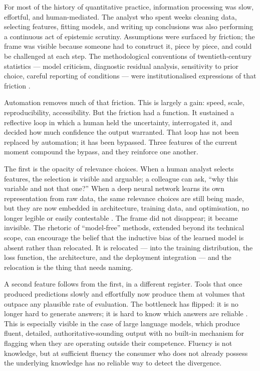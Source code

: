 \documentclass[11pt,a4paper]{article}
\begin{document}
For most of the history of quantitative practice, information processing
was slow, effortful, and human-mediated. The analyst who spent weeks
cleaning data, selecting features, fitting models, and writing up
conclusions was also performing a continuous act of epistemic scrutiny.
Assumptions were surfaced by friction; the frame was visible because
someone had to construct it, piece by piece, and could be challenged at
each step. The methodological conventions of twentieth-century statistics
--- model criticism, diagnostic residual analysis, sensitivity to prior
choice, careful reporting of conditions --- were institutionalised
expressions of that friction
\citep{Box1976,TukeyEDA1977,Cox2006,GelmanShalizi2013}.

Automation removes much of that friction. This is largely a gain: speed,
scale, reproducibility, accessibility. But the friction had a function.
It sustained a reflective loop in which a human held the uncertainty,
interrogated it, and decided how much confidence the output warranted.
That loop has not been replaced by automation; it has been bypassed.
Three features of the current moment compound the bypass, and they
reinforce one another.

The first is the opacity of relevance choices. When a human analyst
selects features, the selection is visible and arguable; a colleague can
ask, ``why this variable and not that one?'' When a deep neural network
learns its own representation from raw data, the same relevance choices
are still being made, but they are now embedded in architecture, training
data, and optimisation, no longer legible or easily contestable
\citep{Burrell2016,DoshiVelezKim2017}. The frame did not disappear; it
became invisible. The rhetoric of ``model-free'' methods, extended beyond
its technical scope, can encourage the belief that the inductive bias of
the learned model is absent rather than relocated. It is relocated ---
into the training distribution, the loss function, the architecture, and
the deployment integration --- and the relocation is the thing that needs
naming.

A second feature follows from the first, in a different register. Tools
that once produced predictions slowly and effortfully now produce them at
volumes that outpace any plausible rate of evaluation. The bottleneck
has flipped: it is no longer hard to generate answers; it is hard to
know which answers are reliable \citep{Bender2021}. This is especially
visible in the case of large language models, which produce fluent,
detailed, authoritative-sounding output with no built-in mechanism for
flagging when they are operating outside their competence. Fluency is
not knowledge, but at sufficient fluency the consumer who does not
already possess the underlying knowledge has no reliable way to detect
the divergence.
\end{document}
